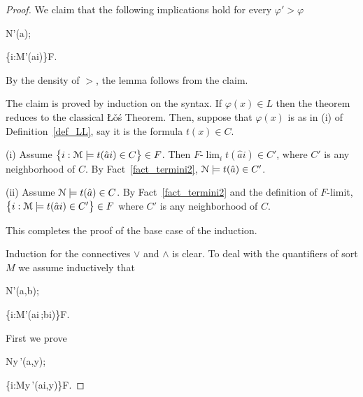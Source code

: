 \documentclass[12pt,letterpaper,oneside,reqno]{amsart}
\theoremstyle{plain}
\theoremstyle{remark}
\begin{document}
\begin{proof}
  We claim that the following implications hold for every $\varphi'>\varphi$

  {\Rightarrow}
  {{\EuScript N}\models\varphi'(\hat a)};

  {\Rightarrow}
  {\big\{i:{\EuScript M}\models\varphi'(\hat ai)\big\}\in F}.
  
  By the density of $>$, the lemma follows from the claim.
  
  The claim is proved by induction on the syntax.
  If $\varphi(x)\in L$ then the theorem reduces to the classical \L\v{o}\'s Theorem. Then, suppose that $\varphi(x)$ is as in (i) of Definition~\ref{def_LL}, say it is the formula $t(x)\in C$.
  
  (\textsf{i})
  Assume $\big\{ i:{\EuScript M}\models t(\hat ai)\in C\big\}\in F$.
  Then $F\mbox{-}\lim_it(\hat ai)\in C'$, where $C'$ is any neighborhood of $C$.
  By Fact~\ref{fact_termini2}, ${\EuScript N}\models t(\hat a)\in C'$.
  
  (\textsf{ii}) Assume ${\EuScript N}\models t(\hat a)\in C$.
  By Fact~\ref{fact_termini2} and the definition of $F$-limit, $\big\{ i:{\EuScript M}\models t(\hat ai)\in C'\big\}\in F$ where $C'$  is any neighborhood of $C$.

  This completes the proof of the base case of the induction.

  Induction for the connectives $\vee$ and $\wedge$ is clear.
  To deal with the quantifiers of sort $M$ we assume inductively that 

  {\Rightarrow}
  {{\EuScript N}\models\varphi'(\hat a,\hat b)};

  {\Rightarrow}
  {\big\{i:{\EuScript M}\models\varphi'(\hat ai\,;\hat bi)\big\}\in F}.
  
  First we prove
  
  {\Rightarrow}
  {{\EuScript N}\models\forall y\,\varphi'(\hat a,y)};

  {\Rightarrow}
  {\big\{i:{\EuScript M}\models\forall y\,\varphi'(\hat ai,y)\big\}\in F}.


\end{proof}
\end{document}
